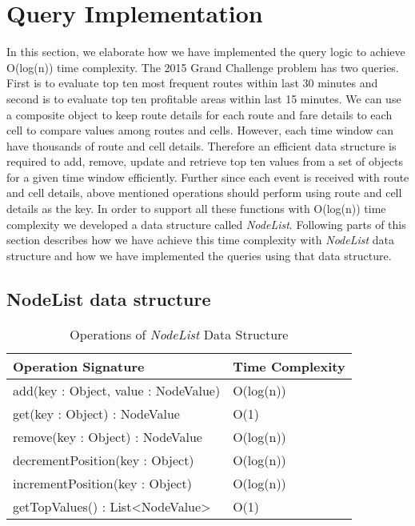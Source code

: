\section{Query Implementation}
In this section, we elaborate how we have implemented the query logic to achieve O(log(n)) time complexity. The 2015 Grand Challenge problem has two queries. First is to evaluate top ten most frequent routes within last 30 minutes and second is to evaluate top ten profitable areas within last 15 minutes. We can use a composite object to keep route details for each route and fare details to each cell to compare values among routes and cells. However, each time window can have thousands of route and cell details. Therefore an efficient data structure is required to add, remove, update and retrieve top ten values from a set of objects for a given time window efficiently. Further since each event is received with route and cell details, above mentioned operations should perform using route and cell details as the key. In order to support all these functions with O(log(n)) time complexity we developed a data structure called \textit{NodeList}. Following parts of this section describes how we have achieve this time complexity with \textit{NodeList} data structure and how we have implemented the queries using that data structure.

\subsection{NodeList data structure}

\begin{table}
\centering
\caption{Operations of \textit{NodeList} Data Structure}
\begin{tabular}{|l|l|} \hline
Operation Signature & Time Complexity \\ \hline \hline
add(key : Object, value : NodeValue) & O(log(n)) \\ \hline 
get(key : Object) : NodeValue & O(1) \\ \hline
remove(key : Object) : NodeValue & O(log(n)) \\ \hline
decrementPosition(key : Object) & O(log(n)) \\ \hline
incrementPosition(key : Object) & O(log(n)) \\ \hline
getTopValues() : List<NodeValue> & O(1) \\ \hline
\end{tabular}
\label{nodelist_api}
\end{table}


